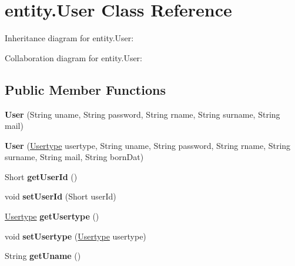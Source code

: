 \hypertarget{classentity_1_1_user}{}\section{entity.\+User Class Reference}
\label{classentity_1_1_user}


Inheritance diagram for entity.\+User\+:


Collaboration diagram for entity.\+User\+:
\subsection*{Public Member Functions}
\begin{DoxyCompactItemize}
\item 
\mbox{\label{classentity_1_1_user_a09931ed66f41c25a1ba237c511285ab5}} 
{\bfseries User} (String uname, String password, String rname, String surname, String mail)
\item 
\mbox{\label{classentity_1_1_user_ad55d052e710440f87bb2d59eb3fd89ce}} 
{\bfseries User} (\mbox{\hyperlink{classentity_1_1_usertype}{Usertype}} usertype, String uname, String password, String rname, String surname, String mail, String born\+Dat)
\item 
\mbox{\label{classentity_1_1_user_a58aa424c3b1544d77ea541feaf49869a}} 
Short {\bfseries get\+User\+Id} ()
\item 
\mbox{\label{classentity_1_1_user_a39f4df0f2a0a0d7cee3be0f372832cd0}} 
void {\bfseries set\+User\+Id} (Short user\+Id)
\item 
\mbox{\label{classentity_1_1_user_a050e73c7a9b10da8cec45c60afe9b942}} 
\mbox{\hyperlink{classentity_1_1_usertype}{Usertype}} {\bfseries get\+Usertype} ()
\item 
\mbox{\label{classentity_1_1_user_a0981e69a22d9baed58f63d8e757ae7a7}} 
void {\bfseries set\+Usertype} (\mbox{\hyperlink{classentity_1_1_usertype}{Usertype}} usertype)
\item 
\mbox{\label{classentity_1_1_user_a633d55162bcdfaf6f4ae0eb621e7897b}} 
String {\bfseries get\+Uname} ()

\end{DoxyCompactItemize}
